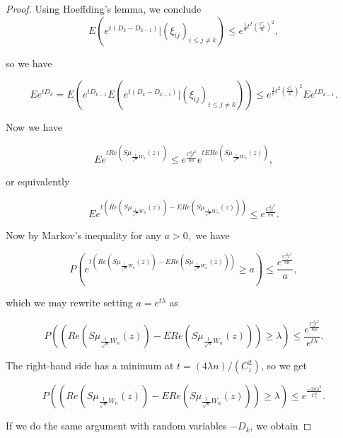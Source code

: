 \documentclass[12pt,a4paper,leqno]{report}
\theoremstyle{plain}
\theoremstyle{definition}
\theoremstyle{remark}
\begin{document}
\begin{proof}
Using Hoeffding's lemma, we conclude
\begin{equation*}
E(e^{t(D_k-D_{k-1})}|(\xi_{ij})_{i\leq j \neq k}) \leq
e^{\frac{1}{8}t^2 \left(\frac{C_z}{n}\right)^2},
\end{equation*}

so we have

\begin{equation*}
Ee^{tD_k} = E(e^{tD_{k-1}}E(e^{t(D_k-D_{k-1})}|(\xi_{ij})_{i\leq j \neq k})) \leq e^{\frac{1}{8}t^2 \left(\frac{C_z}{n}\right)^2}Ee^{tD_{k-1}}. 
\end{equation*}

Now we have 

\begin{equation*}
Ee^{tRe(S\mu_{\frac{1}{\sqrt{n}}W_n}(z))} \leq e^{\frac{C_z^2t^2}{8n}} e^{tERe(S\mu_{\frac{1}{\sqrt{n}}W_n}(z))},
\end{equation*}

or equivalently

\begin{equation*}
Ee^{t(Re(S\mu_{\frac{1}{\sqrt{n}}W_n}(z))-ERe(S\mu_{\frac{1}{\sqrt{n}}W_n}(z)))} \leq e^{\frac{C_z^2t^2}{8n}}.
\end{equation*}

Now by Markov's inequality for any $a > 0,$ we have

\begin{equation*}
P\left(e^{t(Re(S\mu_{\frac{1}{\sqrt{n}}W_n}(z))-ERe(S\mu_{\frac{1}{\sqrt{n}}W_n}(z)))} \geq  a \right) \leq \frac{e^{\frac{C_z^2t^2}{8n}}}{a},
\end{equation*}

which we may rewrite setting $a = e^{t\lambda}$ as

\begin{equation*}
P\left((Re(S\mu_{\frac{1}{\sqrt{n}}W_n}(z))-ERe(S\mu_{\frac{1}{\sqrt{n}}W_n}(z))) \geq  \lambda \right) \leq \frac{e^{\frac{C_z^2t^2}{8n}}}{e^{t\lambda}}.
\end{equation*}

The right-hand side has a minimum at $t=(4\lambda n)/(C_z^2)$, so we get

\begin{equation*}
P\left((Re(S\mu_{\frac{1}{\sqrt{n}}W_n}(z))-ERe(S\mu_{\frac{1}{\sqrt{n}}W_n}(z))) \geq  \lambda \right) \leq
e^{\frac{-2n\lambda^2}{C_z^2}}.
\end{equation*}

If we do the same argument with random variables $-D_k$, we obtain


\end{proof}
\end{document}
